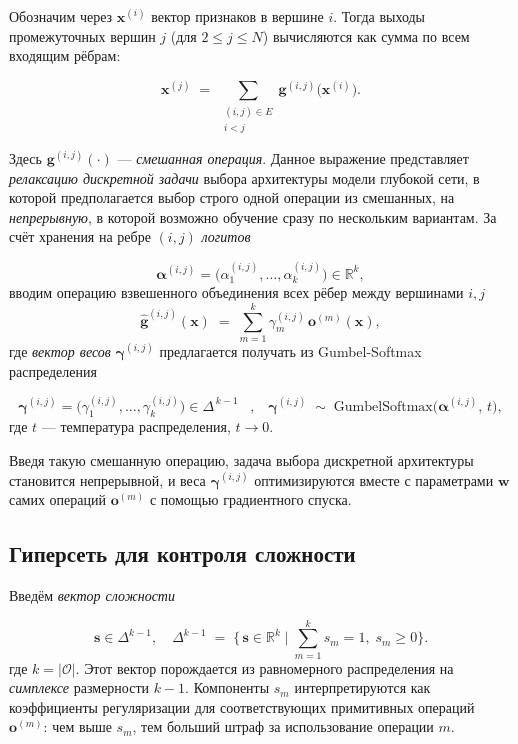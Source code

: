 \documentclass{article}
\begin{document}
Обозначим через $\boldsymbol x^{(i)}$ вектор признаков в вершине $i$. Тогда выходы промежуточных вершин $j$ (для $2 \le j \le N$) вычисляются как сумма по всем входящим рёбрам:

$$
    \boldsymbol x^{(j)} 
    \;=\; 
    \sum_{\substack{(i,j)\in E \\ i<j}} 
    \mathbf{g}^{(i,j)}\bigl(\boldsymbol x^{(i)}\bigr).
$$

Здесь $\mathbf{g}^{(i,j)}(\cdot)$ — \textit{смешанная операция}. Данное выражение представляет \textit{релаксацию дискретной задачи} выбора архитектуры модели глубокой сети, в которой предполагается выбор строго одной операции из смешанных, на \textit{непрерывную}, в которой возможно обучение сразу по нескольким вариантам. За счёт хранения на ребре $(i,j)$ \textit{логитов}

$$
    \boldsymbol{\alpha}^{(i,j)} = \bigl(\alpha^{(i,j)}_1, \dots, \alpha^{(i,j)}_k \bigr)\in \mathbb R^k,
$$
вводим операцию взвешенного объединения всех рёбер между вершинами $i,j$
$$
    \widehat{\mathbf{g}}^{(i,j)}(\boldsymbol x) 
    \;=\; 
    \sum_{m=1}^k 
    \gamma^{(i,j)}_m \,\mathbf{o}^{(m)}(\boldsymbol x),
$$
где \textit{вектор весов} $\boldsymbol{\gamma}^{(i,j)}$ предлагается получать из Gumbel-Softmax распределения

$$
    \boldsymbol{\gamma}^{(i,j)} = \bigl(\gamma^{(i,j)}_1, \dots, \gamma^{(i,j)}_k \bigr)\in \Delta^{\,k-1}
 \;\; \; , \;\;\;   \boldsymbol{\gamma}^{(i,j)} 
    \;\sim\; 
    \mathrm{GumbelSoftmax}\bigl(\boldsymbol{\alpha}^{(i,j)},\,t\bigr),
$$
где $t$ --- температура распределения, $t \rightarrow 0$.  

Введя такую смешанную операцию, задача выбора дискретной архитектуры становится непрерывной, и веса $\boldsymbol{\gamma}^{(i,j)}$ оптимизируются  вместе с параметрами $\boldsymbol{w}$ самих операций $\mathbf{o}^{(m)}$ с помощью градиентного спуска.

\subsection{Гиперсеть для контроля сложности}

Введём \textit{вектор сложности}

$$
\boldsymbol{s} \in \Delta^{k-1}, \quad
\Delta^{k-1} \;=\; \bigl\{\,\boldsymbol{s}\in \mathbb R^k\mid \sum_{m=1}^k s_m = 1,\; s_m\ge0 \bigr\}.
$$
где $k = |\mathcal O|$. Этот вектор порождается из равномерного распределения на \textit{симплексе} размерности $k-1$. Компоненты $s_m$ интерпретируются как коэффициенты регуляризации для соответствующих примитивных операций $\mathbf{o}^{(m)}$: чем выше $s_m$, тем больший штраф за использование операции $m$.
\end{document}

